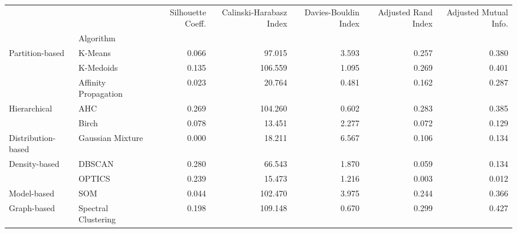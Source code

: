 \begin{tabular}{llrrrrr}
 &  & Silhouette Coeff. & Calinski-Harabasz Index & Davies-Bouldin Index & Adjusted Rand Index & Adjusted Mutual Info. \\
 & Algorithm &  &  &  &  &  \\
\multirow[c]{3}{*}{Partition-based} & K-Means & 0.066 & 97.015 & 3.593 & 0.257 & 0.380 \\
 & K-Medoids & 0.135 & 106.559 & 1.095 & 0.269 & 0.401 \\
 & Affinity Propagation & 0.023 & 20.764 & 0.481 & 0.162 & 0.287 \\
\multirow[c]{2}{*}{Hierarchical} & AHC & 0.269 & 104.260 & 0.602 & 0.283 & 0.385 \\
 & Birch & 0.078 & 13.451 & 2.277 & 0.072 & 0.129 \\
Distribution-based & Gaussian Mixture & 0.000 & 18.211 & 6.567 & 0.106 & 0.134 \\
\multirow[c]{2}{*}{Density-based} & DBSCAN & 0.280 & 66.543 & 1.870 & 0.059 & 0.134 \\
 & OPTICS & 0.239 & 15.473 & 1.216 & 0.003 & 0.012 \\
Model-based & SOM & 0.044 & 102.470 & 3.975 & 0.244 & 0.366 \\
Graph-based & Spectral Clustering & 0.198 & 109.148 & 0.670 & 0.299 & 0.427 \\
\end{tabular}

